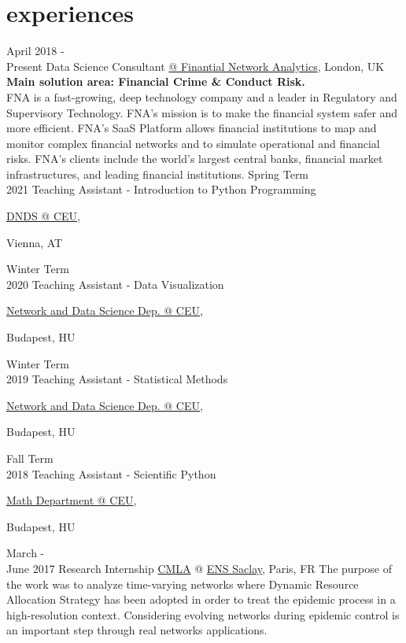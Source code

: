 \documentclass[]{cv-style}     %
\begin{document}
\section{experiences}
\begin{entrylist}
\entry
{April 2018 - \\Present}
{Data Science Consultant}
{\href{http://www.fna.fi}{@ Finantial Network Analytics}, London, UK}
{\footnotesize{\textbf{Main solution area: Financial Crime \& Conduct Risk.}}\\
FNA is a fast-growing, deep technology company and a leader in Regulatory and Supervisory
Technology. FNA's mission is to make the financial system safer and more efficient. FNA's SaaS Platform allows financial institutions to map and monitor complex financial networks and to simulate operational and financial risks. FNA’s clients include the world’s largest central banks, financial market infrastructures, and leading financial institutions.
}
\entry
{Spring Term\\2021}
{Teaching Assistant - Introduction to Python Programming}
{\href{http://www.ceu.edu}{DNDS @ CEU},
\begin{flushright}Vienna, AT
 \end{flushright}
}
{ }
\entry
{Winter Term\\2020}
{Teaching Assistant - Data Visualization}
{\href{http://www.ceu.edu}{Network and Data Science Dep. @ CEU},
\begin{flushright}Budapest, HU
 \end{flushright}
}
{ }
\entry
{Winter Term\\2019}
{Teaching Assistant - Statistical Methods}
{\href{http://www.ceu.edu}{Network and Data Science Dep. @ CEU},
\begin{flushright}Budapest, HU
 \end{flushright}
}
{ }
\entry
{Fall Term\\2018}
{Teaching Assistant - Scientific Python}
{\href{http://www.ceu.edu}{Math Department @ CEU},
\begin{flushright}Budapest, HU
 \end{flushright}
}
{ }
\entry
{March -\\June 2017}
{Research Internship}
{\href{http://www.cmla.ens-cachan.fr/}{CMLA} @ \href{http://www.ens-cachan.fr/}{ENS Saclay}, Paris, FR}
{The purpose of the work was to analyze time-varying networks where Dynamic Resource Allocation Strategy has been adopted in order to treat the epidemic process in a high-resolution context. Considering evolving networks during epidemic control is an important step through real networks applications.}
\end{entrylist}
\end{document}
